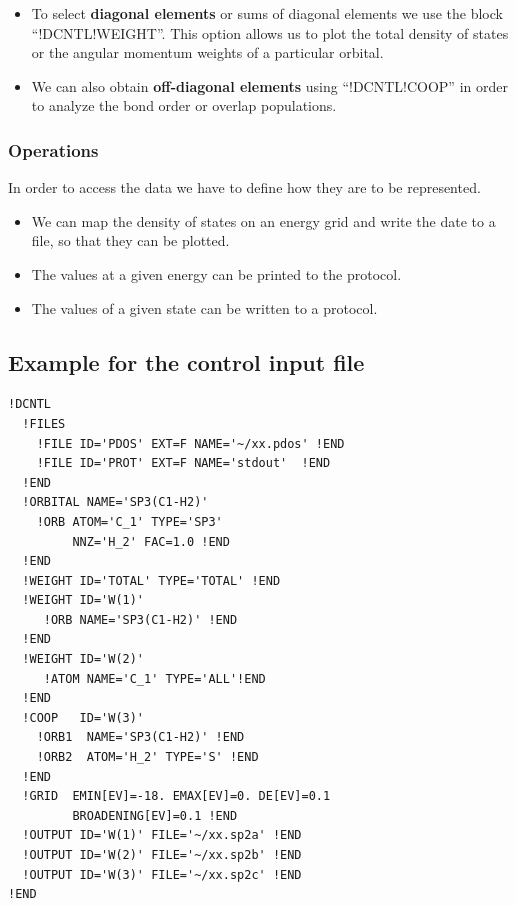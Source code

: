 \documentclass[final,12pt]{article}
\begin{document}
{\begin{itemize}

\item To select {\bf diagonal elements} or sums of diagonal elements we use
  the block ``!DCNTL!WEIGHT''. This option allows us to plot the
  total density of states or the angular momentum weights of a
  particular orbital.

\item We can also obtain {\bf off-diagonal elements} using
  ``!DCNTL!COOP'' in order to analyze the bond order or overlap
  populations.

\end{itemize}

\subsubsection{Operations}

In order to access the data we have to define how they are to be
represented.

\begin{itemize}
\item We can map the density of states on an energy grid and write the
  date to a file, so that they can be plotted.
\item The values at a given energy can be printed to the protocol.
\item The values of a given state can be written to a protocol.
\end{itemize}


\subsection{Example for the control input file}

\begin{verbatim}
!DCNTL
  !FILES 
    !FILE ID='PDOS' EXT=F NAME='~/xx.pdos' !END
    !FILE ID='PROT' EXT=F NAME='stdout'  !END
  !END
  !ORBITAL NAME='SP3(C1-H2)'
    !ORB ATOM='C_1' TYPE='SP3' 
         NNZ='H_2' FAC=1.0 !END
  !END
  !WEIGHT ID='TOTAL' TYPE='TOTAL' !END
  !WEIGHT ID='W(1)'
     !ORB NAME='SP3(C1-H2)' !END
  !END
  !WEIGHT ID='W(2)'
     !ATOM NAME='C_1' TYPE='ALL'!END
  !END
  !COOP   ID='W(3)'
    !ORB1  NAME='SP3(C1-H2)' !END
    !ORB2  ATOM='H_2' TYPE='S' !END
  !END
  !GRID  EMIN[EV]=-18. EMAX[EV]=0. DE[EV]=0.1 
         BROADENING[EV]=0.1 !END
  !OUTPUT ID='W(1)' FILE='~/xx.sp2a' !END
  !OUTPUT ID='W(2)' FILE='~/xx.sp2b' !END
  !OUTPUT ID='W(3)' FILE='~/xx.sp2c' !END
!END
\end{verbatim}

}
\end{document}
